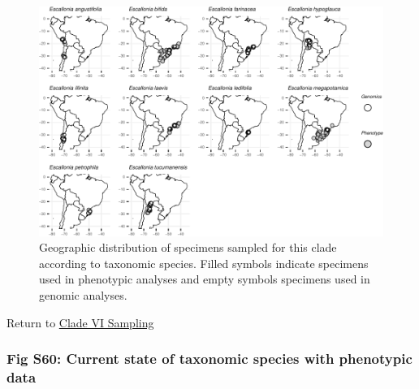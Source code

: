 \documentclass[
  11pt,
]{article}
\begin{document}
\begin{figure}

{\centering \includegraphics{Supplementary_Material_files/figure-latex/CladeVIsamplingMaps-1} 

}

\caption{Geographic distribution of specimens sampled for this clade according to taxonomic species. Filled symbols indicate specimens used in phenotypic analyses and empty symbols specimens used in genomic analyses.}\label{fig:CladeVIsamplingMaps}
\end{figure}

Return to \protect\hyperlink{sampling-6}{Clade VI Sampling}
\pagebreak

\hypertarget{fig-s60-current-state-of-taxonomic-species-with-phenotypic-data}{%
\subsubsection{Fig S60: Current state of taxonomic species with phenotypic data}\label{fig-s60-current-state-of-taxonomic-species-with-phenotypic-data}}
\end{document}
